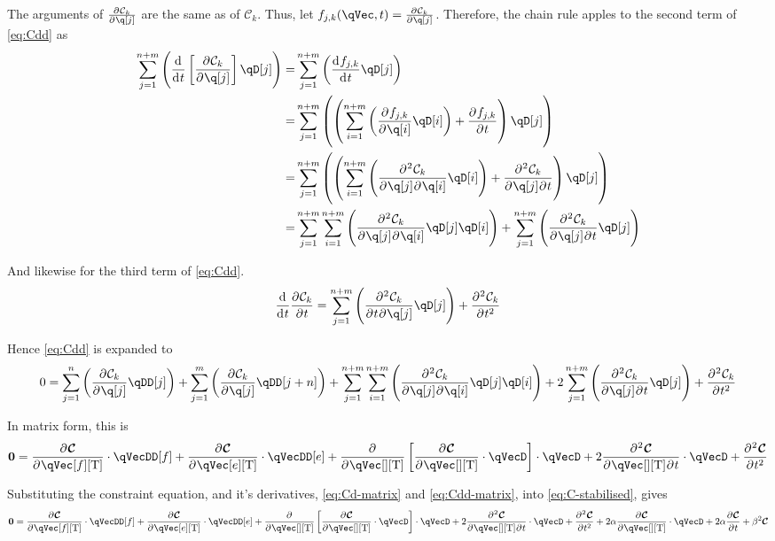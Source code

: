 \documentclass[11pt]{article}
\newcommand{\oD}[2]{
    \frac{\mathrm{d}\mspace{1mu}#1}{\mathrm{d}\mspace{1mu}#2}
}
\newcommand{\pD}[2]{
    \frac{\partial\mspace{1mu}#1}{\partial\mspace{1mu}#2}
}
\newcommand{\pDDtt}[2]{
    \frac{\partial{^{\mspace{1mu}2}}\mspace{1mu}#1}{\partial\mspace{1mu}#2^2}
}
\newcommand{\pDD}[3]{
    \frac{\partial{^{\mspace{1mu}2}}\mspace{1mu}#1}{\partial\mspace{1mu}#2\mspace{1mu}\partial\mspace{1mu}#3}
}
\begin{document}
The arguments of $\pD{\mathcal{C}_k}{\q[j]}$ are the same as of $\mathcal{C}_k$. Thus, let $f_{j,k}(\qVec, t)=\pD{\mathcal{C}_k}{\q[j]}$. Therefore, the chain rule apples to the second term of \eqref{eq:Cdd} as
\begin{align}
    \sum_{j=1}^{n+m} \del{\oD{}{t}\sbr{\pD{\mathcal{C}_k}{\q[j]}}\qD[j]}
    =& \sum_{j=1}^{n+m} \del{\oD{f_{j,k}}{t}\qD[j]} \nonumber\\
    =& \sum_{j=1}^{n+m} \del{\del{
            \sum_{i=1}^{n+m} \del{\pD{f_{j,k}}{\q[i]}\qD[i]}
            + \pD{f_{j,k}}{t}
        }\qD[j]} \nonumber\\
    =& \sum_{j=1}^{n+m} \del{\del{
            \sum_{i=1}^{n+m} \del{\pDD{\mathcal{C}_k}{\q[j]}{\q[i]}\qD[i]}
            + \pDD{\mathcal{C}_k}{\q[j]}{t}
        }\qD[j]} \nonumber\\
    =& \sum_{j=1}^{n+m} \sum_{i=1}^{n+m} \del{\pDD{\mathcal{C}_k}{\q[j]}{\q[i]}\qD[j]\qD[i]}
            + \sum_{j=1}^{n+m} \del{\pDD{\mathcal{C}_k}{\q[j]}{t}\qD[j]}
\end{align}

And likewise for the third term of \eqref{eq:Cdd}.
\begin{equation}
    \oD{}{t}\pD{\mathcal{C}_k}{t}
    = \sum_{j=1}^{n+m} \del{\pDD{\mathcal{C}_k}{t}{\q[j]}\qD[j]}
    + \pDDtt{\mathcal{C}_k}{t}
\end{equation}

Hence \eqref{eq:Cdd} is expanded to
\begin{equation} \label{eq:Cdd-expanded}
    0= \sum_{j=1}^{n} \del{\pD{\mathcal{C}_k}{\q[j]}\qDD[j]}
        + \sum_{j=1}^{m} \del{\pD{\mathcal{C}_k}{\q[j]}\qDD[j+n]}
        + \sum_{j=1}^{n+m} \sum_{i=1}^{n+m} \del{\pDD{\mathcal{C}_k}{\q[j]}{\q[i]}\qD[j]\qD[i]}
        + 2\sum_{j=1}^{n+m} \del{\pDD{\mathcal{C}_k}{\q[j]}{t}\qD[j]}
        + \pDDtt{\mathcal{C}_k}{t}
\end{equation}

In matrix form, this is
\begin{equation} \label{eq:Cdd-matrix}
    \mathbf{0}= \pD{\bm{\mathcal{C}}}{\qVec[f][\mathrm{T}]} \cdot \qVecDD[f]
        + \pD{\bm{\mathcal{C}}}{\qVec[e][\mathrm{T}]} \cdot \qVecDD[e]
        + \pD{}{\qVec[][\mathrm{T}]}\sbr{\pD{\bm{\mathcal{C}}}{\qVec[][\mathrm{T}]} \cdot \qVecD} \cdot \qVecD
        + 2\pDD{\bm{\mathcal{C}}}{\qVec[][\mathrm{T}]}{t} \cdot \qVecD
        + \pDDtt{\bm{\mathcal{C}}}{t}
\end{equation}

Substituting the constraint equation, and it's derivatives, \eqref{eq:Cd-matrix} and \eqref{eq:Cdd-matrix}, into \eqref{eq:C-stabilised}, gives
\begin{equation}
    \mathbf{0} = \pD{\bm{\mathcal{C}}}{\qVec[f][\mathrm{T}]} \cdot \qVecDD[f]
        + \pD{\bm{\mathcal{C}}}{\qVec[e][\mathrm{T}]} \cdot \qVecDD[e]
        + \pD{}{\qVec[][\mathrm{T}]}\sbr{\pD{\bm{\mathcal{C}}}{\qVec[][\mathrm{T}]} \cdot \qVecD} \cdot \qVecD
        + 2\pDD{\bm{\mathcal{C}}}{\qVec[][\mathrm{T}]}{t} \cdot \qVecD
        + \pDDtt{\bm{\mathcal{C}}}{t}
    +2\alpha\pD{\bm{\mathcal{C}}}{\qVec[][\mathrm{T}]} \cdot \qVecD
    + 2\alpha\pD{\bm{\mathcal{C}}}{t}
    + \beta^2\bm{\mathcal{C}}
\end{equation}
\end{document}

